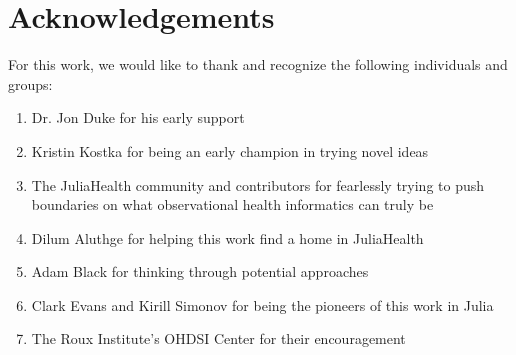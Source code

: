\documentclass{juliacon}
\begin{document}
\section{Acknowledgements}

For this work, we would like to thank and recognize the following individuals and groups: 

\begin{enumerate}

  \item Dr. Jon Duke for his early support
  \item Kristin Kostka for being an early champion in trying novel ideas
  \item The JuliaHealth community and contributors for fearlessly trying to push boundaries on what observational health informatics can truly be
  \item Dilum Aluthge for helping this work find a home in JuliaHealth
  \item Adam Black for thinking through potential approaches
  \item Clark Evans and Kirill Simonov for being the pioneers of this work in Julia
  \item The Roux Institute's OHDSI Center for their encouragement

\end{enumerate}


\end{document}
